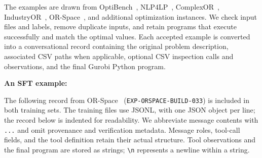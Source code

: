 \documentclass[11pt]{article}
\begin{document}
\begin{enumerate}[label=(AssoE.\arabic*),leftmargin=*]
\begin{enumerate}[label=(R2.Major.\arabic*),leftmargin=*]
The examples are drawn from OptiBench~\citep{yang2025optibench}, NLP4LP~\citep{ahmaditeshnizi2024optimus03}, ComplexOR~\citep{xiao2024chainofexperts}, IndustryOR~\citep{huang2025orlm}, OR-Space~\citep{zhou2026orspace}, and additional optimization instances. We check input files and labels, remove duplicate inputs, and retain programs that execute successfully and match the optimal values. Each accepted example is converted into a conversational record containing the original problem description, associated CSV paths when applicable, optional CSV inspection calls and observations, and the final Gurobi Python program.

\medskip
\textbf{An SFT example:}

The following record from OR-Space~\citep{zhou2026orspace} (\texttt{EXP-ORSPACE-BUILD-033}) is included in both training sets. The training files use JSONL, with one JSON object per line; the record below is indented for readability. We abbreviate message contents with \texttt{...} and omit provenance and verification metadata. Message roles, tool-call fields, and the tool definition retain their actual structure. Tool observations and the final program are stored as strings; \texttt{\textbackslash n} represents a newline within a string.


\end{enumerate}
\end{enumerate}
\end{document}
